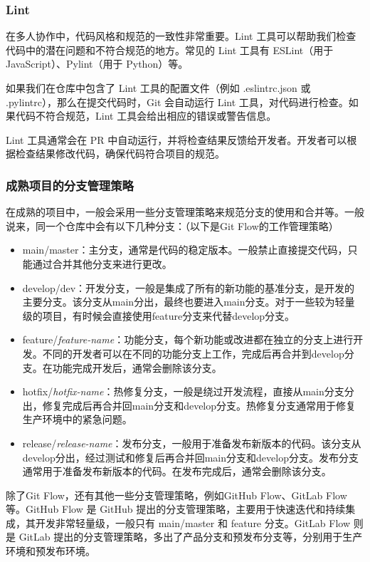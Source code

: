 \documentclass[../main.tex]{subfiles}
\begin{document}
\subsubsection{Lint}

在多人协作中，代码风格和规范的一致性非常重要。Lint 工具可以帮助我们检查代码中的潜在问题和不符合规范的地方。常见的 Lint 工具有 ESLint（用于 JavaScript）、Pylint（用于 Python）等。

如果我们在仓库中包含了 Lint 工具的配置文件（例如 .eslintrc.json 或 .pylintrc），那么在提交代码时，Git 会自动运行 Lint 工具，对代码进行检查。如果代码不符合规范，Lint 工具会给出相应的错误或警告信息。

Lint 工具通常会在 PR 中自动运行，并将检查结果反馈给开发者。开发者可以根据检查结果修改代码，确保代码符合项目的规范。

\subsubsection{成熟项目的分支管理策略}

在成熟的项目中，一般会采用一些分支管理策略来规范分支的使用和合并等。一般说来，同一个仓库中会有以下几种分支：（以下是Git Flow的工作管理策略）
\begin{itemize}
  \item main/master：主分支，通常是代码的稳定版本。一般禁止直接提交代码，只能通过合并其他分支来进行更改。
  \item develop/dev：开发分支，一般是集成了所有的新功能的基准分支，是开发的主要分支。该分支从main分出，最终也要进入main分支。对于一些较为轻量级的项目，有时候会直接使用feature分支来代替develop分支。
  \item feature/\textit{feature-name}：功能分支，每个新功能或改进都在独立的分支上进行开发。不同的开发者可以在不同的功能分支上工作，完成后再合并到develop分支。在功能完成开发后，通常会删除该分支。
  \item hotfix/\textit{hotfix-name}：热修复分支，一般是绕过开发流程，直接从main分支分出，修复完成后再合并回main分支和develop分支。热修复分支通常用于修复生产环境中的紧急问题。
  \item release/\textit{release-name}：发布分支，一般用于准备发布新版本的代码。该分支从develop分出，经过测试和修复后再合并回main分支和develop分支。发布分支通常用于准备发布新版本的代码。在发布完成后，通常会删除该分支。
\end{itemize}

除了Git Flow，还有其他一些分支管理策略，例如GitHub Flow、GitLab Flow等。GitHub Flow 是 GitHub 提出的分支管理策略，主要用于快速迭代和持续集成，其开发非常轻量级，一般只有 main/master 和 feature 分支。GitLab Flow 则是 GitLab 提出的分支管理策略，多出了产品分支和预发布分支等，分别用于生产环境和预发布环境。
\end{document}
